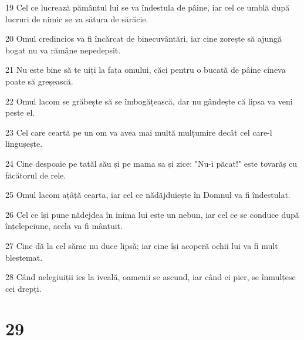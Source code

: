 \par 19 Cel ce lucrează pământul lui se va îndestula de pâine, iar cel ce umblă după lucruri de nimic se va sătura de sărăcie.
\par 20 Omul credincios va fi încărcat de binecuvântări, iar cine zorește să ajungă bogat nu va rămâne nepedepsit.
\par 21 Nu este bine să te uiți la fața omului, căci pentru o bucată de pâine cineva poate să greșească.
\par 22 Omul lacom se grăbește să se îmbogățească, dar nu gândește că lipsa va veni peste el.
\par 23 Cel care ceartă pe un om va avea mai multă mulțumire decât cel care-l lingușește.
\par 24 Cine despoaie pe tatăl său și pe mama sa și zice: "Nu-i păcat!" este tovarăș cu făcătorul de rele.
\par 25 Omul lacom ațâță cearta, iar cel ce nădăjduiește în Domnul va fi îndestulat.
\par 26 Cel ce își pune nădejdea în inima lui este un nebun, iar cel ce se conduce după înțelepciune, acela va fi mântuit.
\par 27 Cine dă la cel sărac nu duce lipsă; iar cine își acoperă ochii lui va fi mult blestemat.
\par 28 Când nelegiuiții ies la iveală, oamenii se ascund, iar când ei pier, se înmulțesc cei drepți.

\chapter{29}

